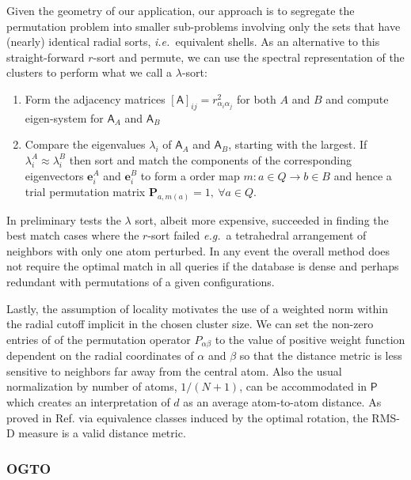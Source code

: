 \documentclass[journal=jctcce,manuscript=article]{achemso}
\newcommand{\cref}[1]{{Ref. \citenum{#1}}}
\newcommand{\ie}{{\it i.e.\ }}
\newcommand{\eg}{{\it e.g.\ }}
\newcommand{\As}{\mathsf{A}}
\newcommand{\eb}{\mathbf{e}}
\newcommand{\Pb}{\mathbf{P}}
\newcommand{\Ps}{\mathsf{P}}
\begin{document}
Given the geometry of our application, our approach is to segregate the permutation problem into smaller sub-problems involving only the sets that have (nearly) identical radial sorts, \ie equivalent shells. 
As an alternative to this straight-forward $r$-sort and permute, we can use the spectral representation of the clusters to perform what we call a $\lambda$-sort:
\begin{enumerate} \setlength{\itemsep}{-10pt}
\item Form the adjacency matrices $[\As]_{ij} = r^2_{\alpha_i\alpha_j} $ for both $A$ and $B$ and compute eigen-system for $\As_A$ and $\As_B$
\item Compare the eigenvalues $\lambda_i$ of $\As_A$ and $\As_B$, starting with the largest. 
If $\lambda_i^A \approx \lambda_i^B$ then sort and match the components of the corresponding eigenvectors $\eb_i^A$ and $\eb_i^B$ to form a order map $m: a \in Q \to  b \in B$ and hence a trial permutation matrix $\Pb_{a,m(a)} = 1, \ \forall a \in Q$. 
\end{enumerate}
In preliminary tests the $\lambda$ sort, albeit more expensive, succeeded in finding the best match cases where the $r$-sort failed \eg a tetrahedral arrangement of neighbors with only one atom perturbed.
In any event the overall method does not require the optimal match in all queries if the database is dense and perhaps redundant with permutations of a given configurations.

Lastly, the assumption of locality motivates the use of a weighted norm within the radial cutoff implicit in the chosen cluster size.
We can set the non-zero entries of of the permutation operator $P_{\alpha\beta}$ to the value of positive weight function dependent on the radial coordinates of $\alpha$ and $\beta$ 
so that the distance metric is less sensitive to neighbors far away from the central atom.
Also the usual normalization by number of atoms, $1/(N+1)$, can be accommodated in $\Ps$ which creates an interpretation of $d$ as an average atom-to-atom distance.
As proved in \cref{Steipe2002} via equivalence classes induced by the optimal rotation, the RMS-D measure is a valid distance metric.

\subsubsection{OGTO}
\end{document}
